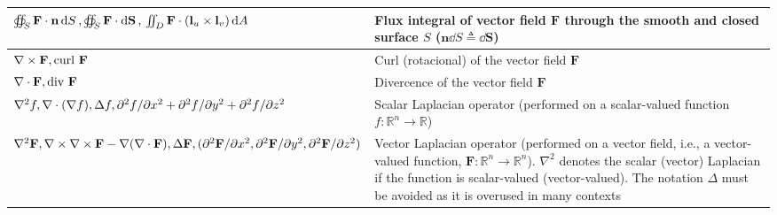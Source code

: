 \documentclass{article}
\begin{document}
\begin{xltabular}{\textwidth}{XX}
	\(\oiint_S \mathbf{F}\cdot \mathbf{n} \dd{S}, \oiint_S \mathbf{F} \cdot \dd{\mathbf{S}}, \newline \iint_D \mathbf{F} \cdot (\mathbf{l}_u\times\mathbf{l}_v) \dd{A}\)                                                                       & Flux integral of vector field \(\mathbf{F}\) through the smooth and closed surface \(S\) (\(\mathbf{n} \dd{S} \triangleq \dd{\mathbf{S}}\))                                                                                                             \\ \hline
	\(\nabla \times \mathbf{F} , \textnormal{curl } \mathbf{F}\)                                                                                                                                                                               & Curl (rotacional) of the vector field \(\mathbf{F}\)                                                                                                                                                                                                    \\ \hline
	\(\nabla \cdot \mathbf{F} , \textnormal{div } \mathbf{F}\)                                                                                                                                                                                 & Divercence of the vector field \(\mathbf{F}\)                                                                                                                                                                                                           \\ \hline
	\(\nabla^2 f, \nabla \cdot (\nabla f), \Delta f, \newline \partial^2f/\partial x^2 + \partial^2f/\partial y^2 + \partial^2f/\partial z^2\)                                                                                                 & Scalar Laplacian operator (performed on a scalar-valued function \(f: \mathbb{R}^{n} \rightarrow \mathbb{R}\))                                                                                                                                          \\ \hline
	\(\nabla^2 \mathbf{F}, \nabla \times \nabla \times \mathbf{F} - \nabla(\nabla \cdot \mathbf{F}), \Delta \mathbf{F}, \newline (\partial^2\mathbf{F}/\partial x^2 , \partial^2\mathbf{F}/\partial y^2 , \partial^2\mathbf{F}/\partial z^2)\) & Vector Laplacian operator (performed on a vector field, i.e., a vector-valued function, \(\mathbf{F}: \mathbb{R}^{n} \rightarrow \mathbb{R}^{n}\)). \(\nabla^2\) denotes the scalar (vector) Laplacian if the function is scalar-valued (vector-valued). The notation \(\Delta\) must be avoided as it is overused in many contexts \\
\end{xltabular}
\end{document}
